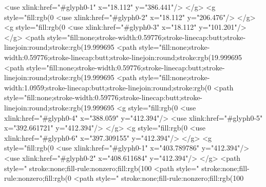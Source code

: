   <use xlink:href="#glyph0-1" x="18.112" y="386.441"/>
</g>
<g style="fill:rgb(0%
  <use xlink:href="#glyph0-2" x="18.112" y="206.476"/>
</g>
<g style="fill:rgb(0%
  <use xlink:href="#glyph0-3" x="18.112" y="101.201"/>
</g>
<path style="fill:none;stroke-width:0.59776;stroke-linecap:butt;stroke-linejoin:round;stroke:rgb(19.999695%
<path style="fill:none;stroke-width:0.59776;stroke-linecap:butt;stroke-linejoin:round;stroke:rgb(19.999695%
<path style="fill:none;stroke-width:0.59776;stroke-linecap:butt;stroke-linejoin:round;stroke:rgb(19.999695%
<path style="fill:none;stroke-width:1.0959;stroke-linecap:butt;stroke-linejoin:round;stroke:rgb(0%
<path style="fill:none;stroke-width:0.59776;stroke-linecap:butt;stroke-linejoin:round;stroke:rgb(19.999695%
<g style="fill:rgb(0%
  <use xlink:href="#glyph0-4" x="388.059" y="412.394"/>
  <use xlink:href="#glyph0-5" x="392.661721" y="412.394"/>
</g>
<g style="fill:rgb(0%
  <use xlink:href="#glyph0-6" x="397.309155" y="412.394"/>
</g>
<g style="fill:rgb(0%
  <use xlink:href="#glyph0-1" x="403.789786" y="412.394"/>
  <use xlink:href="#glyph0-2" x="408.611684" y="412.394"/>
</g>
<path style=" stroke:none;fill-rule:nonzero;fill:rgb(100%
<path style=" stroke:none;fill-rule:nonzero;fill:rgb(0%
<path style=" stroke:none;fill-rule:nonzero;fill:rgb(100%
